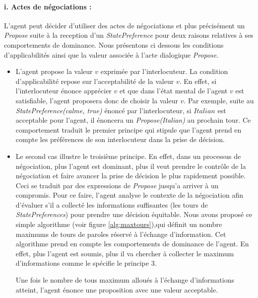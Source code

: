 		\paragraph{ i. Actes de négociations :}
			L'agent peut décider d'utiliser des actes de négociations et plus précisément un \emph{Propose} suite à la reception d'un \emph{StatePreference} pour deux raisons relatives à ses comportements de dominance. Nous présentons ci dessous les conditions d'applicabilités ainsi que la valeur associée à l'acte dialogique \emph{Propose}. 
			\begin{itemize}
				
				\item L'agent propose la valeur $v$ exprimée par l'interlocuteur. La condition d'applicabilité repose sur l'acceptabilité de la valeur $v$. En effet, si l'interlocuteur énonce apprécier $v$ et que dans l'état mental de l'agent $v$ est satisfiable, l'agent proposera donc de choisir la valeur $v$. Par exemple, suite au \emph{StatePreference(calme, true)} énoncé par l'interlocuteur, si $Italian$ est acceptable pour l'agent, il énoncera un \emph{Propose(Italian)} au prochain tour. Ce comportement traduit le premier principe qui stipule que l'agent prend en compte les préférences de son interlocuteur dans la prise de décision.
				
				\item Le second cas illustre le troisième principe. En effet, dans un processus de négociation, plus l'agent est dominant, plus il veut prendre le contrôle de la négociation et faire avancer la prise de décision le plus rapidement possible. Ceci se traduit par des expressions de \emph{Propose} jusqu'a arriver à un compromis.
				Pour ce faire, l'agent analyse le contexte de la négociation afin d'évaluer s'il a collecté les informations suffisantes (les tours de \emph{StatePreferences}) pour prendre une décision équitable. Nous avons proposé ce simple algorithme (voir figure \ref{alg:maxtours}),qui définit un nombre maximums de tours de paroles réservé à l'échange d'information. Cet algorithme prend en compte les comportements de dominance de l'agent. En effet, plus l'agent est soumis, plus il va chercher à collecter le maximum d'informations comme le spécifie le principe 3. 
				
				Une fois le nombre de tous maximum alloués à l'échange d'informations atteint, l'agent énonce une proposition avec une valeur acceptable. 
								
			\end{itemize}
			
